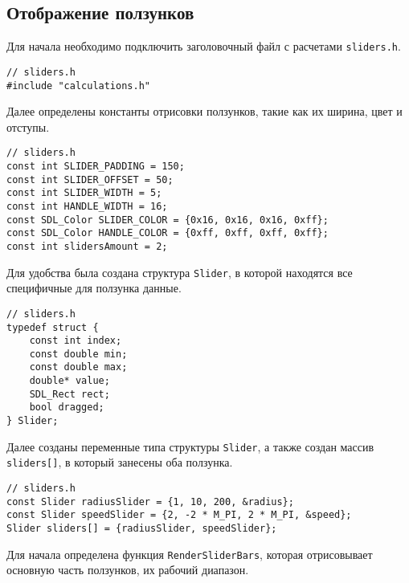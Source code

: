 \documentclass[14pt]{extarticle}
\begin{document}
{    {
        \par
        \subsection{Отображение ползунков}
        \label{sec:sliders}
        \par
    }

    Для начала необходимо подключить заголовочный файл с расчетами \verb|sliders.h|.
    \begin{lstlisting}
// sliders.h
#include "calculations.h"\end{lstlisting}
    \par
    \begin{spacing}{1.5}
        Далее определены константы отрисовки ползунков, такие как их ширина, цвет и отступы.
    \end{spacing}

    \begin{lstlisting}
// sliders.h
const int SLIDER_PADDING = 150;
const int SLIDER_OFFSET = 50;
const int SLIDER_WIDTH = 5;
const int HANDLE_WIDTH = 16;
const SDL_Color SLIDER_COLOR = {0x16, 0x16, 0x16, 0xff};
const SDL_Color HANDLE_COLOR = {0xff, 0xff, 0xff, 0xff};
const int slidersAmount = 2;\end{lstlisting}

    \begin{spacing}{1.5}
        Для удобства была создана структура \verb|Slider|, в которой находятся все специфичные для ползунка данные.
    \end{spacing}

    \begin{lstlisting}
// sliders.h
typedef struct {
	const int index;
	const double min;
	const double max;
	double* value;
	SDL_Rect rect;
	bool dragged;
} Slider;\end{lstlisting}

    \begin{spacing}{1.5}
        Далее созданы переменные типа структуры \verb|Slider|, а также создан массив \verb|sliders[]|, в который занесены оба ползунка.
    \end{spacing}

    \begin{lstlisting}
// sliders.h
const Slider radiusSlider = {1, 10, 200, &radius};
const Slider speedSlider = {2, -2 * M_PI, 2 * M_PI, &speed};
Slider sliders[] = {radiusSlider, speedSlider};\end{lstlisting}

    \begin{spacing}{1.5}
        Для начала определена функция \verb|RenderSliderBars|, которая отрисовывает основную часть ползунков, их рабочий диапазон.
    \end{spacing}

}
\end{document}
